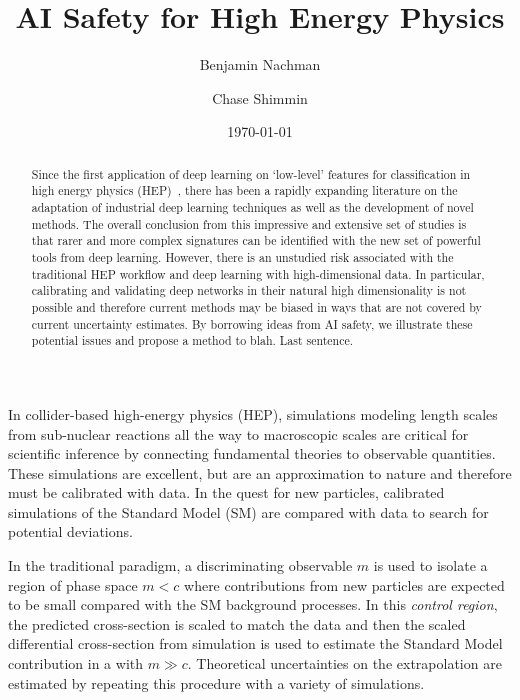 \documentclass[reprint,nofootinbib,...]{revtex4-1}
\begin{document}
\title{AI Safety for High Energy Physics}

\author{Benjamin Nachman}


\author{Chase Shimmin}


\begin{abstract}
Since the first application of deep learning on `low-level' features for classification in high energy physics (HEP)~\cite{Baldi:2014kfa}, there has been a rapidly expanding literature on the adaptation of industrial deep learning techniques as well as the development of novel methods.  The overall conclusion from this impressive and extensive set of studies is that rarer and more complex signatures can be identified with the new set of powerful tools from deep learning.  However, there is an unstudied risk associated with the traditional HEP workflow and deep learning with high-dimensional data.  In particular, calibrating and validating deep networks in their natural high dimensionality is not possible and therefore current methods may be biased in ways that are not covered by current uncertainty estimates.  By borrowing ideas from AI safety, we illustrate these potential issues and propose a method to blah.  Last sentence.
\end{abstract}

\date{\today}
\maketitle


In collider-based high-energy physics (HEP), simulations modeling length scales from sub-nuclear reactions all the way to macroscopic scales are critical for scientific inference by connecting fundamental theories to observable quantities.  These simulations are excellent, but are an approximation to nature and therefore must be calibrated with data. In the quest for new particles, calibrated simulations of the Standard Model (SM) are compared with data to search for potential deviations.

In the traditional paradigm, a discriminating observable $m$ is used to isolate a region of phase space $m<c$ where contributions from new particles are expected to be small compared with the SM background processes.  In this \textit{control region}, the predicted cross-section is scaled to match the data and then the scaled differential cross-section from simulation is used to estimate the Standard Model contribution in a  with $m\gg c$.  Theoretical uncertainties on the extrapolation are estimated by repeating this procedure with a variety of simulations.
\end{document}
